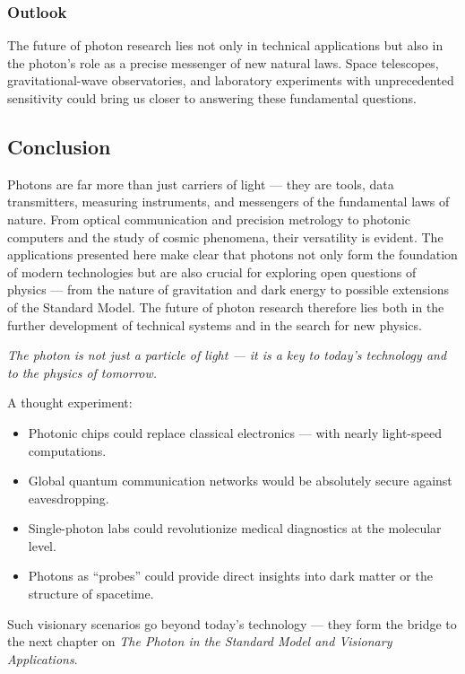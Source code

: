 \subsubsection{Outlook}

The future of photon research lies not only in technical applications but also in the photon’s role as a precise messenger of new natural laws.  
Space telescopes, gravitational-wave observatories, and laboratory experiments with unprecedented sensitivity could bring us closer to answering these fundamental questions.

\subsection{Conclusion}

Photons are far more than just carriers of light — they are tools, data transmitters, measuring instruments, and messengers of the fundamental laws of nature.  
From optical communication and precision metrology to photonic computers and the study of cosmic phenomena, their versatility is evident.  
The applications presented here make clear that photons not only form the foundation of modern technologies but are also crucial for exploring open questions of physics — from the nature of gravitation and dark energy to possible extensions of the Standard Model.  
The future of photon research therefore lies both in the further development of technical systems and in the search for new physics.

\medskip
\emph{The photon is not just a particle of light — it is a key to today’s technology and to the physics of tomorrow.}
\vspace{1em}
\begin{tcolorbox}[hypobox, title={What If We Could Fully Control Photons?}]
	\label{box:hypo_kapVII}
	A thought experiment: 
	\begin{itemize}
		\item Photonic chips could replace classical electronics — with nearly light-speed computations.
		\item Global quantum communication networks would be absolutely secure against eavesdropping.
		\item Single-photon labs could revolutionize medical diagnostics at the molecular level.
		\item Photons as “probes” could provide direct insights into dark matter or the structure of spacetime.
	\end{itemize}
	\medskip
	Such visionary scenarios go beyond today’s technology — they form the bridge to the next chapter on \emph{The Photon in the Standard Model and Visionary Applications}.
\end{tcolorbox}



